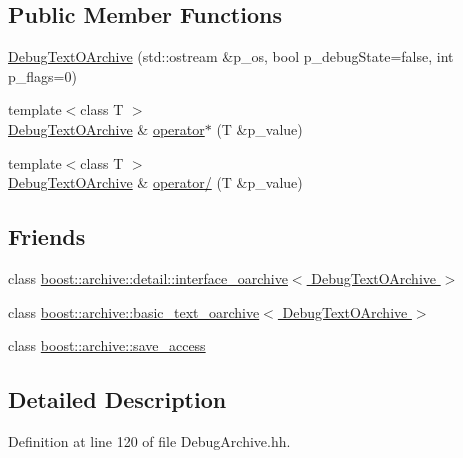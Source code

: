 \subsection*{Public Member Functions}
\begin{DoxyCompactItemize}
\item 
\hyperlink{classxtd_1_1serializer_1_1DebugTextOArchive_ac8705c1c468911d8b0c74b29156a8b8e}{Debug\+Text\+O\+Archive} (std\+::ostream \&p\+\_\+os, bool p\+\_\+debug\+State=false, int p\+\_\+flags=0)
\item 
{\footnotesize template$<$class T $>$ }\\\hyperlink{classxtd_1_1serializer_1_1DebugTextOArchive}{Debug\+Text\+O\+Archive} \& \hyperlink{classxtd_1_1serializer_1_1DebugTextOArchive_a03483bda8da712cbd5f789bcd3c20659}{operator$\ast$} (T \&p\+\_\+value)
\item 
{\footnotesize template$<$class T $>$ }\\\hyperlink{classxtd_1_1serializer_1_1DebugTextOArchive}{Debug\+Text\+O\+Archive} \& \hyperlink{classxtd_1_1serializer_1_1DebugTextOArchive_ab5bd315f1a6d164814d0ae28fca9ab1d}{operator/} (T \&p\+\_\+value)
\end{DoxyCompactItemize}
\subsection*{Friends}
\begin{DoxyCompactItemize}
\item 
class \hyperlink{classxtd_1_1serializer_1_1DebugTextOArchive_a162d16419084090d0d406eb1f23dfa6d}{boost\+::archive\+::detail\+::interface\+\_\+oarchive$<$ Debug\+Text\+O\+Archive $>$}
\item 
class \hyperlink{classxtd_1_1serializer_1_1DebugTextOArchive_ac712c773113f2ae2a71ee1f638877ab2}{boost\+::archive\+::basic\+\_\+text\+\_\+oarchive$<$ Debug\+Text\+O\+Archive $>$}
\item 
class \hyperlink{classxtd_1_1serializer_1_1DebugTextOArchive_aaca003bb8a4fc59424e4025130da4edd}{boost\+::archive\+::save\+\_\+access}
\end{DoxyCompactItemize}


\subsection{Detailed Description}


Definition at line 120 of file Debug\+Archive.\+hh.



